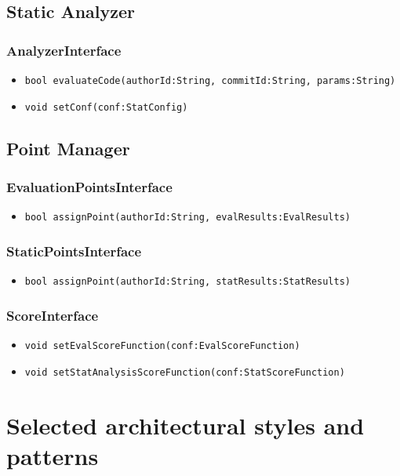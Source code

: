\subsection{Static Analyzer}
\subsubsection{AnalyzerInterface}
\begin{itemize}
    \item \texttt{bool evaluateCode(authorId:String, commitId:String, params:String)}
    \item \texttt{void setConf(conf:StatConfig)}
\end{itemize}

\subsection{Point Manager}
\subsubsection{EvaluationPointsInterface}
\begin{itemize}
    \item \texttt{bool assignPoint(authorId:String, evalResults:EvalResults)}
\end{itemize}

\subsubsection{StaticPointsInterface}
\begin{itemize}
    \item \texttt{bool assignPoint(authorId:String, statResults:StatResults)}
\end{itemize}

\subsubsection{ScoreInterface}
\begin{itemize}
    \item \texttt{void setEvalScoreFunction(conf:EvalScoreFunction)}
    \item \texttt{void setStatAnalysisScoreFunction(conf:StatScoreFunction)}
\end{itemize}

\newpage

\section{Selected architectural styles and patterns}
\label{s:selected-architectural-styles-and-patterns}%

